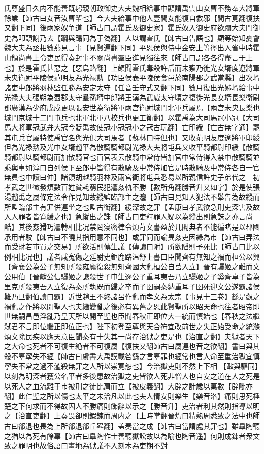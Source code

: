 氏尊盛日久内不能善既躬親朝政御史大夫魏相給事中顯謂禹雲山女曹不務奉大將軍餘業【師古曰女音汝曹輩也】今大夫給事中他人壹間女能復自救邪【間古莧翻復扶又翻下同】後兩家奴争道【師古曰謂霍氏及御史家】霍氏奴入御史府欲躢大夫門御史為叩頭謝乃去【躢與蹋同為于偽翻】人以謂霍氏【師古曰告語也】顯等始知憂會魏大夫為丞相數燕見言事【見賢遍翻下同】平恩侯與侍中金安上等徑出入省中時霍山領尚書上令吏民得奏封事不關尚書羣臣進見獨往來【師古曰謂各各得盡言于上也】於是霍氏甚惡之【惡烏路翻】上頗聞霍氏毒殺許后而未察乃徙光女壻度遼將軍未央衛尉平陵侯范明友為光禄勲【功臣侯表平陵侯食邑於南陽郡之武當縣】出次壻諸吏中郎將羽林監任勝為安定太守【任音壬守式又翻下同】數月復出光姊壻給事中光禄大夫張朔為蜀郡太守羣孫壻中郎將王漢為武威太守頃之復徙光長女壻長樂衛尉鄧廣漢為少府戊戍更以張安世為衛將軍兩宫衛尉城門北軍兵屬焉【兩宫未央長樂也城門京城十二門屯兵也北軍北軍八校兵也更工衡翻】以霍禹為大司馬冠小冠【大司馬大將軍冠武弁大冠今貶禹故使冠小冠冠小之冠古玩翻】亡印綬【亡古無字通】罷其屯兵官屬特使禹官名與光俱大司馬者【蘇林曰特但也】又收范明友度遼將軍印綬但為光禄勲及光中女壻趙平為散騎騎都尉光禄大夫將屯兵又收平騎都尉印綬【散騎騎都尉以騎都尉而加散騎官也百官表云散騎中常侍皆加官中常侍得入禁中散騎騎並乘輿車如淳曰自列侯下至郎中皆得有散騎及中常侍加官是時散騎及中常侍各自一官無員也中讀曰仲】諸領胡越騎羽林及兩宫衛將屯兵悉易以所親信許史子弟代之　初孝武之世徵發煩數百姓貧耗窮民犯灋姦軌不勝【數所角翻勝音升又如字】於是使張湯趙禹之屬條定法令作見知故縱監臨部主之灋【師古曰見知人犯法不舉告為故縱而所監臨部主有罪併連坐之也監古衘翻】緩深故之罪【孟康曰孝武欲急刑吏深害及故入人罪者皆寛緩之也】急縱出之誅【師古曰吏釋罪人疑以為縱出則急誅之亦言尚酷】其後姦猾巧灋轉相比况禁罔寖密律令煩苛文書盈於几閣典者不能徧睹是以郡國承用者駮【師古曰不曉其指用意不同也】或罪同而論異姦吏因緣為市【師古曰弄法而受財若市買之交易】所欲活則傳生議【傳讀曰附】所欲䧟則予死比【師古曰比以例相比况也】議者咸寃傷之廷尉史鉅鹿路温舒上書曰臣聞齊有無知之禍而桓公以興【齊襄公為公子無知所殺雍廪復殺無知齊國大亂桓公自莒入立】晉有驪姬之難而文公用伯【晉獻公信驪姬之讒殺世子申生逐公子重耳夷吾乃立驪姬之子奚齊卓子皆為里克所殺夷吾入立復為秦所執既而歸之卒而子圉嗣秦納重耳子圉死迎文公遂霸諸侯難乃旦翻伯讀曰霸】近世趙王不終諸呂作亂而孝文為太宗【事見十三卷】繇是觀之禍亂之作將以開聖人也夫繼變亂之後必有異舊之恩此賢聖所以昭天命也往者昭帝即世無嗣昌邑淫亂乃皇天所以開至聖也臣聞春秋正即位大一統而慎始也【春秋之法繼弑君不言即位繼正即位正也】陛下初登至尊與天合符宜改前世之失正始受命之統滌煩文除民疾以應天意臣聞秦有十失其一尚存治獄之吏是也【治直之翻】夫獄者天下之大命也死者不可復生絶者不可復屬【復扶又翻師古曰屬連也音之欲翻】書曰與其殺不辜寧失不經【師古曰虞書大禹謨載咎繇之言辜罪也經常也言人命至重治獄宜慎寧失不常之過不濫殺無罪之人所以崇寛恕也】今治獄吏則不然上下相【敺與驅同】以刻為明深者獲公名平者多後患故治獄之吏皆欲人死非憎人也自安之道在人之死是以死人之血流離于市被刑之徒比肩而立【被皮義翻】大辟之計歲以萬數【辟毗亦翻】此仁聖之所以傷也太平之未洽凡以此也夫人情安則樂生【樂音洛】痛則思死棰楚之下何求而不得故囚人不勝痛則飾辭以示之【勝音升】吏治者利其然則指導以明之【治直吏翻】上奏畏卻則鍜鍊而周内之【上時掌翻晉灼曰精熟周悉致之法中也師古曰郤退也畏為上所郤退郤丘畧翻】盖奏當之成【師古曰當謂處其罪也】雖臯陶聽之猶以為死有餘辜【師古曰臯陶作士善聽獄訟故以為喻也陶音遥】何則成鍊者衆文致之罪明也故俗語曰畫地為獄議不入刻木為吏期不對